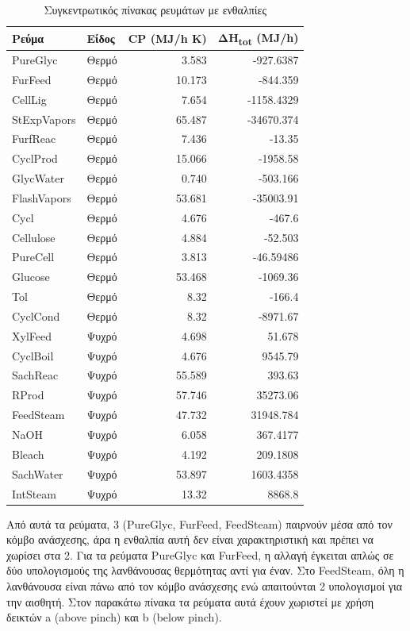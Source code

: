 \documentclass[11pt]{article}
\begin{document}
\begin{table}[htbp]
\caption{Συγκεντρωτικός πίνακας ρευμάτων με ενθαλπίες}
\centering
\begin{tabular}{llrr}
Ρεύμα & Είδος & CP (MJ/h K) & ΔΗ\textsubscript{tot} (MJ/h)\\
\hline
PureGlyc & Θερμό & 3.583 & -927.6387\\
FurFeed & Θερμό & 10.173 & -844.359\\
CellLig & Θερμό & 7.654 & -1158.4329\\
StExpVapors & Θερμό & 65.487 & -34670.374\\
FurfReac & Θερμό & 7.436 & -13.35\\
CyclProd & Θερμό & 15.066 & -1958.58\\
GlycWater & Θερμό & 0.740 & -503.166\\
FlashVapors & Θερμό & 53.681 & -35003.91\\
Cycl & Θερμό & 4.676 & -467.6\\
Cellulose & Θερμό & 4.884 & -52.503\\
PureCell & Θερμό & 3.813 & -46.59486\\
Glucose & Θερμό & 53.468 & -1069.36\\
Tol & Θερμό & 8.32 & -166.4\\
CyclCond & Θερμό & 8.32 & -8971.67\\
\hline
XylFeed & Ψυχρό & 4.698 & 51.678\\
CyclBoil & Ψυχρό & 4.676 & 9545.79\\
SachReac & Ψυχρό & 55.589 & 393.63\\
RProd & Ψυχρό & 57.746 & 35273.06\\
FeedSteam & Ψυχρό & 47.732 & 31948.784\\
NaOH & Ψυχρό & 6.058 & 367.4177\\
Bleach & Ψυχρό & 4.192 & 209.1808\\
SachWater & Ψυχρό & 53.897 & 1603.4358\\
IntSteam & Ψυχρό & 13.32 & 8868.8\\
\end{tabular}
\end{table}

Από αυτά τα ρεύματα, 3 (PureGlyc, FurFeed, FeedSteam) παιρνούν μέσα από τον κόμβο ανάσχεσης, άρα η ενθαλπία αυτή δεν είναι χαρακτηριστική και πρέπει να χωρίσει στα 2. Για τα ρεύματα PureGlyc και FurFeed, η αλλαγή έγκειται απλώς σε δύο υπολογισμούς της λανθάνουσας θερμότητας αντί για έναν. Στο FeedSteam, όλη η λανθάνουσα είναι πάνω από τον κόμβο ανάσχεσης ενώ απαιτούνται 2 υπολογισμοί για την αισθητή. Στον παρακάτω πίνακα τα ρεύματα αυτά έχουν χωριστεί με χρήση δεικτών a (above pinch) και b (below pinch).
\end{document}
